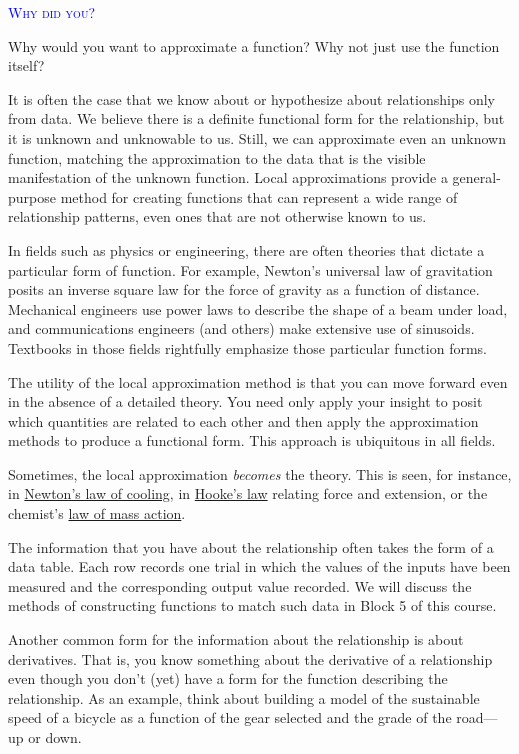 \documentclass[
  letterpaper,
  DIV=11,
  numbers=noendperiod,
  oneside]{scrreprt}
\newenvironment{why}%
{%
\textcolor{blue}{\hrulefill}%
  \par\vspace{.3\baselineskip}%
  \textcolor{blue}{\scshape Why did you?}%
  \par\vspace{\baselineskip}%
}%
{\textcolor{blue}{\hrulefill}}
\begin{document}
\begin{why}
Why would you want to approximate a function? Why not just use the
function itself?

It is often the case that we know about or hypothesize about
relationships only from data. We believe there is a definite functional
form for the relationship, but it is unknown and unknowable to us.
Still, we can approximate even an unknown function, matching the
approximation to the data that is the visible manifestation of the
unknown function. Local approximations provide a general-purpose method
for creating functions that can represent a wide range of relationship
patterns, even ones that are not otherwise known to us.

In fields such as physics or engineering, there are often theories that
dictate a particular form of function. For example, Newton's universal
law of gravitation posits an inverse square law for the force of gravity
as a function of distance. Mechanical engineers use power laws to
describe the shape of a beam under load, and communications engineers
(and others) make extensive use of sinusoids. Textbooks in those fields
rightfully emphasize those particular function forms.

The utility of the local approximation method is that you can move
forward even in the absence of a detailed theory. You need only apply
your insight to posit which quantities are related to each other and
then apply the approximation methods to produce a functional form. This
approach is ubiquitous in all fields.

Sometimes, the local approximation \emph{becomes} the theory. This is
seen, for instance, in
\href{https://en.wikipedia.org/wiki/Newton\%27s_law_of_cooling}{Newton's
law of cooling}, in
\href{https://en.wikipedia.org/wiki/Hooke\%27s_law}{Hooke's law}
relating force and extension, or the chemist's
\href{https://en.wikipedia.org/wiki/Law_of_mass_action}{law of mass
action}.

\end{why}

The information that you have about the relationship often takes the
form of a data table. Each row records one trial in which the values of
the inputs have been measured and the corresponding output value
recorded. We will discuss the methods of constructing functions to match
such data in Block 5 of this course.

Another common form for the information about the relationship is about
derivatives. That is, you know something about the derivative of a
relationship even though you don't (yet) have a form for the function
describing the relationship. As an example, think about building a model
of the sustainable speed of a bicycle as a function of the gear selected
and the grade of the road---up or down.
\end{document}
